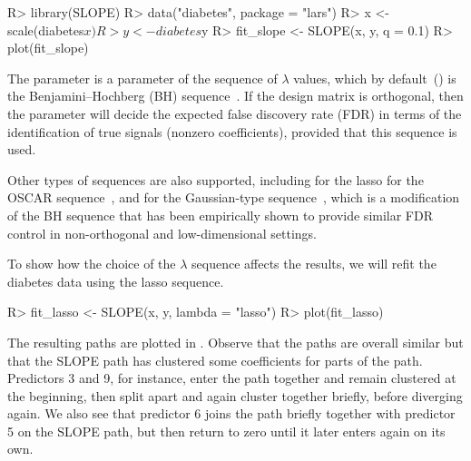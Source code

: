 \documentclass[article]{jss}
\let\Cref\crtCref
\begin{document}
\begin{Code}
R> library(SLOPE)
R> data("diabetes", package = "lars")
R> x <- scale(diabetes$x)
R> y <- diabetes$y
R> fit_slope <- SLOPE(x, y, q = 0.1)
R> plot(fit_slope)
\end{Code}

The  parameter is a parameter of the sequence of \(\lambda\) values,
which by default~() is the Benjamini--Hochberg (BH)
sequence~\citep{bogdan2015}. If the design matrix is orthogonal, then the
 parameter will decide the expected false discovery rate (FDR) in terms
of the identification of true signals (nonzero coefficients), provided
that this sequence is used.

Other types of sequences are also supported,
including  for the lasso
 for the OSCAR sequence~\citep{bondell2008}, and
 for the Gaussian-type sequence~\citep{bogdan2015},
which is a modification of the BH sequence that has been empirically shown to
provide similar FDR control in non-orthogonal and low-dimensional settings.

To show how the choice of the \(\lambda\) sequence affects the
results, we will refit the diabetes data using the lasso sequence.

\begin{Code}
R> fit_lasso <- SLOPE(x, y, lambda = "lasso")
R> plot(fit_lasso)
\end{Code}

The resulting paths are plotted in \Cref{fig:diabetes}. Observe that the
paths are overall similar but that the SLOPE path has clustered
some coefficients for parts of the path. Predictors 3 and 9, for instance,
enter the path together and remain clustered at the beginning, then
split apart and again cluster together briefly, before diverging again.
We also see that predictor 6 joins the path briefly together
with predictor 5 on the SLOPE path, but then return to zero until
it later enters again on its own.
\end{document}
